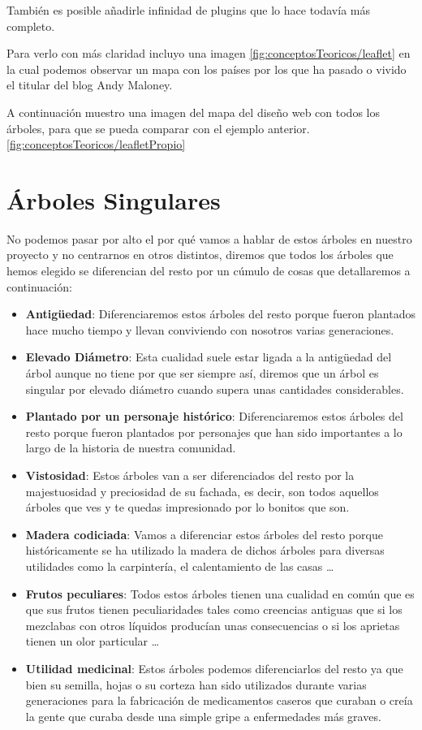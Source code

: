También es posible añadirle infinidad de plugins que lo hace todavía más completo.

Para verlo con más claridad incluyo una imagen \ref{fig:conceptosTeoricos/leaflet} en la cual podemos observar un mapa con los países por los que ha pasado o vivido el titular del blog Andy Maloney.


A continuación muestro una imagen del mapa del diseño web con todos los árboles, para que se pueda comparar con el ejemplo anterior. \ref{fig:conceptosTeoricos/leafletPropio}

\newpage

\section{Árboles Singulares}

No podemos pasar por alto el por qué vamos a hablar de estos árboles en nuestro proyecto y no centrarnos en otros distintos, diremos que todos los árboles que hemos elegido se diferencian del resto por un cúmulo de cosas que detallaremos a continuación:

\begin{itemize}
	\item \textbf{Antigüedad}: Diferenciaremos estos árboles del resto porque fueron plantados hace mucho tiempo y llevan conviviendo con nosotros varias generaciones.  
	\item \textbf{Elevado Diámetro}: Esta cualidad suele estar ligada a la antigüedad del árbol aunque no tiene por que ser siempre así, diremos que un árbol es singular por elevado diámetro cuando supera unas cantidades considerables.
	\item \textbf{Plantado por un personaje histórico}: Diferenciaremos estos árboles del resto porque fueron plantados por personajes que han sido importantes a lo largo de la historia de nuestra comunidad.
	\item \textbf{Vistosidad}: Estos árboles van a ser diferenciados del resto por la majestuosidad y preciosidad de su fachada, es decir, son todos aquellos árboles que ves y te quedas impresionado por lo bonitos que son. 
	\item \textbf{Madera codiciada}: Vamos a diferenciar estos árboles del resto porque históricamente se ha utilizado la madera de dichos árboles para diversas utilidades como la carpintería, el calentamiento de las casas \ldots
	\item \textbf{Frutos peculiares}: Todos estos árboles tienen una cualidad en común que es que sus frutos tienen peculiaridades tales como creencias antiguas que si los mezclabas con otros líquidos producían unas consecuencias o si los aprietas tienen un olor particular \ldots
	\item \textbf{Utilidad medicinal}: Estos árboles podemos diferenciarlos del resto ya que bien su semilla, hojas o su corteza han sido utilizados durante varias generaciones para la fabricación de medicamentos caseros que curaban o creía la gente que curaba desde una simple gripe a enfermedades más graves.
\end{itemize}
